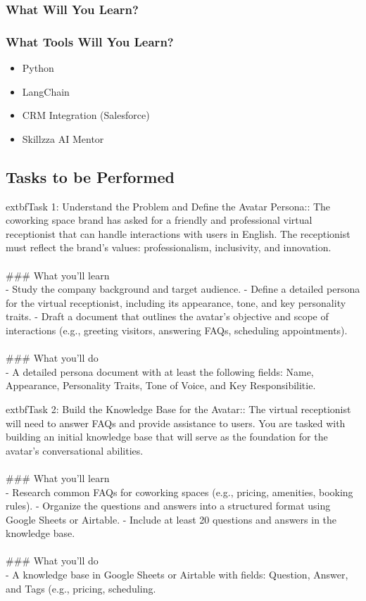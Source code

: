 \documentclass{article}
\begin{document}
\subsubsection*{What Will You Learn?}
\begin{itemize}
\end{itemize}

\subsubsection*{What Tools Will You Learn?}
\begin{itemize}
    \item Python
    \item LangChain
    \item CRM Integration (Salesforce)
    \item Skillzza AI Mentor
\end{itemize}

\subsection*{Tasks to be Performed}
	extbf{Task 1:} Understand the Problem and Define the Avatar Persona:: The coworking space brand has asked for a friendly and professional virtual receptionist that can handle interactions with users in English. The receptionist must reflect the brand’s values: professionalism, inclusivity, and innovation. \\
 \\
### What you'll learn \\
- Study the company background and target audience. - Define a detailed persona for the virtual receptionist, including its appearance, tone, and key personality traits. - Draft a document that outlines the avatar’s objective and scope of interactions (e.g., greeting visitors, answering FAQs, scheduling appointments).  \\
 \\
### What you'll do \\
- A detailed persona document with at least the following fields: Name, Appearance, Personality Traits, Tone of Voice, and Key Responsibilitie.

	extbf{Task 2:} Build the Knowledge Base for the Avatar:: The virtual receptionist will need to answer FAQs and provide assistance to users. You are tasked with building an initial knowledge base that will serve as the foundation for the avatar’s conversational abilities. \\
 \\
### What you'll learn \\
- Research common FAQs for coworking spaces (e.g., pricing, amenities, booking rules). - Organize the questions and answers into a structured format using Google Sheets or Airtable. - Include at least 20 questions and answers in the knowledge base. \\
 \\
### What you'll do \\
- A knowledge base in Google Sheets or Airtable with fields: Question, Answer, and Tags (e.g., pricing, scheduling.
\end{document}
